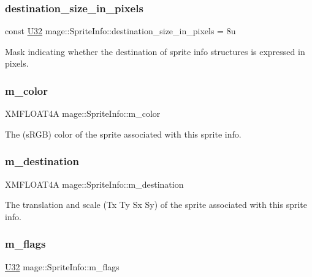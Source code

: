 \subsubsection{\texorpdfstring{destination\+\_\+size\+\_\+in\+\_\+pixels}{destination\_size\_in\_pixels}}
{\footnotesize\ttfamily const \hyperlink{namespacemage_a41c104c036fba3756a74e19f793eeaa1}{U32} mage\+::\+Sprite\+Info\+::destination\+\_\+size\+\_\+in\+\_\+pixels = 8u\hspace{0.3cm}{\ttfamily [static]}}

Mask indicating whether the destination of sprite info structures is expressed in pixels. \hypertarget{structmage_1_1_sprite_info_ab76316069522fc10f9580b705406ed16}{}\label{structmage_1_1_sprite_info_ab76316069522fc10f9580b705406ed16} 
\subsubsection{\texorpdfstring{m\+\_\+color}{m\_color}}
{\footnotesize\ttfamily X\+M\+F\+L\+O\+A\+T4A mage\+::\+Sprite\+Info\+::m\+\_\+color}

The (s\+R\+GB) color of the sprite associated with this sprite info. \hypertarget{structmage_1_1_sprite_info_a40a00e6cf76fc333309d706f064deed8}{}\label{structmage_1_1_sprite_info_a40a00e6cf76fc333309d706f064deed8} 
\subsubsection{\texorpdfstring{m\+\_\+destination}{m\_destination}}
{\footnotesize\ttfamily X\+M\+F\+L\+O\+A\+T4A mage\+::\+Sprite\+Info\+::m\+\_\+destination}

The translation and scale (Tx Ty Sx Sy) of the sprite associated with this sprite info. \hypertarget{structmage_1_1_sprite_info_a9f3802944651a58e02831e5f2cb4a53e}{}\label{structmage_1_1_sprite_info_a9f3802944651a58e02831e5f2cb4a53e} 
\subsubsection{\texorpdfstring{m\+\_\+flags}{m\_flags}}
{\footnotesize\ttfamily \hyperlink{namespacemage_a41c104c036fba3756a74e19f793eeaa1}{U32} mage\+::\+Sprite\+Info\+::m\+\_\+flags}

